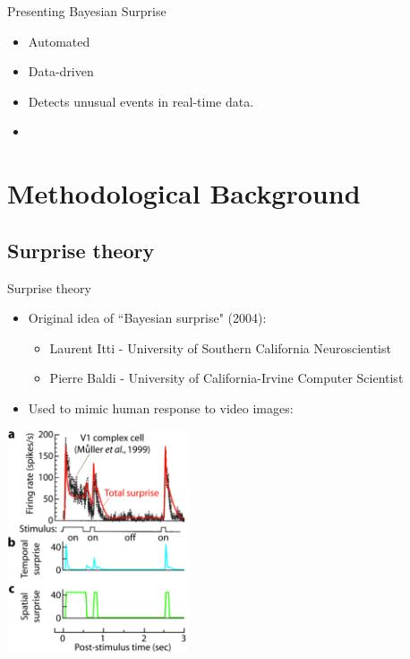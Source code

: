 \documentclass{beamer}
\begin{document}
\begin{frame}{Presenting Bayesian Surprise}
	\begin{itemize}
		\item Automated
		\item Data-driven
		\item Detects unusual events in real-time data.
		\item {}
	\end{itemize}
\end{frame}


\section{Methodological Background}


\subsection{Surprise theory}


\begin{frame}{Surprise theory}
	\begin{itemize}
		\item Original idea of ``Bayesian surprise" (2004):
		\begin{itemize}
			\item Laurent Itti - University of Southern California Neuroscientist
			\item Pierre Baldi - University of California-Irvine Computer Scientist
		\end{itemize}
		\item Used to mimic human response to video images:
	\end{itemize}
	\vspace{-1mm}
	\begin{center}
		\includegraphics[width=0.4\textwidth]{../../figures/surprise-ittibaldi}
	\end{center}
\end{frame}
\end{document}
